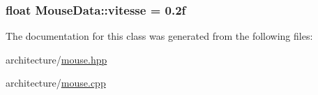 \subsubsection[{\texorpdfstring{vitesse}{vitesse}}]{\setlength{\rightskip}{0pt plus 5cm}float Mouse\+Data\+::vitesse = 0.\+2f\hspace{0.3cm}{\ttfamily [static]}}\hypertarget{class_mouse_data_a86d3b28c7d10597467bb0288e6863941}{}\label{class_mouse_data_a86d3b28c7d10597467bb0288e6863941}


The documentation for this class was generated from the following files\+:\begin{DoxyCompactItemize}
\item 
architecture/\hyperlink{mouse_8hpp}{mouse.\+hpp}\item 
architecture/\hyperlink{mouse_8cpp}{mouse.\+cpp}\end{DoxyCompactItemize}
